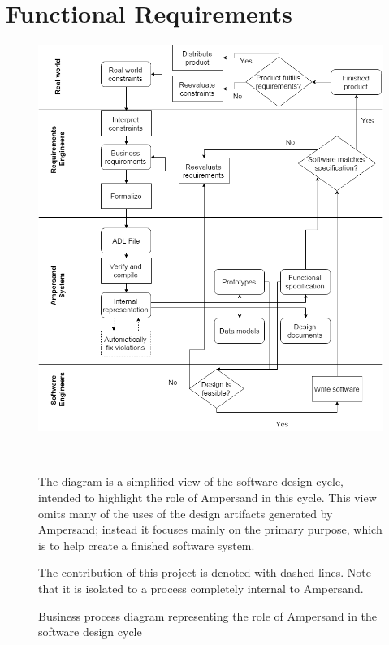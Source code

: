 \documentclass[12pt]{report}
\begin{document}
\chapter{Functional Requirements}\label{ch:Functional}
\begin{figure}[!htb]
    \begin{center}
        \includegraphics[width=\textwidth]{../figures/business_process}
        \caption{Business process diagram representing the role of Ampersand in 
        the software design cycle}~\label{fig:BusinessProcess} \end{center}
The diagram is a simplified view of the software design cycle, intended to 
highlight 
the role of Ampersand in this cycle. This view omits many of the uses of the 
design artifacts generated by Ampersand; instead it focuses mainly on the 
primary purpose, which is to help create a finished software system. 

The contribution of this project is denoted with dashed lines. Note that it is
isolated to a process completely internal to Ampersand.    
\end{figure}
\end{document}
